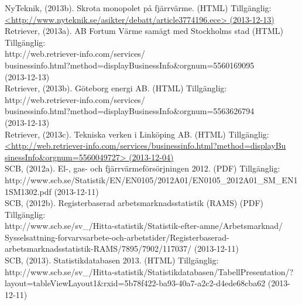 \documentclass[10pt,a4paper]{article}
\begin{document}
NyTeknik, (2013b). Skrota monopolet på fjärrvärme. (HTML)
Tillgänglig: \\
\hyperref{http://www.nyteknik.se/asikter/debatt/article3774196.ece}{}{}{<http://www.nyteknik.se/asikter/debatt/article3774196.ece>
  (2013-12-13)}\\

Retriever, (2013a). AB Fortum Värme samägt med Stockholms stad (HTML) Tillgänglig: \\
http://web.retriever-info.com/services/\\businessinfo.html?method=displayBusinessInfo\&orgnum=5560169095\\(2013-12-13)\\

Retriever, (2013b). Göteborg energi AB. (HTML) Tillgänglig: \\
http://web.retriever-info.com/services/\\businessinfo.html?method=displayBusinessInfo\&orgnum=5563626794\\
(2013-12-13)\\

Retriever, (2013c). Tekniska verken i Linköping AB. (HTML) Tillgänglig: \\
\hyperref{http://web.retriever-info.com/services/businessinfo.html?method=displayBusinessInfo\&orgnum=5560049727}{}{}{<http://web.retriever-info.com/services/businessinfo.html?method=displayBu\\sinessInfo\&orgnum=5560049727> (2013-12-04)}\\

SCB, (2012a). El-, gas- och fjärrvärmeförsörjningen 2012. (PDF) Tillgänglig:\\
http://www.scb.se/Statistik/EN/EN0105/2012A01/EN0105\_2012A01\_SM\_EN11SM1302.pdf (2013-12-11)\\

SCB, (2012b). Registerbaserad arbetsmarknadsstatistik (RAMS) (PDF) Tillgänglig:\\
http://www.scb.se/sv\_/Hitta-statistik/Statistik-efter-amne/Arbetsmarknad/ \\Sysselsattning-forvarvsarbete-och-arbetstider/Registerbaserad-arbetsmarknadsstatistik-RAMS/7895/7902/117037/ (2013-12-11)\\

SCB, (2013). Statistikdatabasen 2013. (HTML) Tillgänglig:\\
http://www.scb.se/sv\_/Hitta-statistik/Statistikdatabasen/TabellPresentation/?\\layout=tableViewLayout1\&rxid=5b78f422-ba93-40a7-a2c2-d4ede68cba62 (2013-12-11)\\
\end{document}
